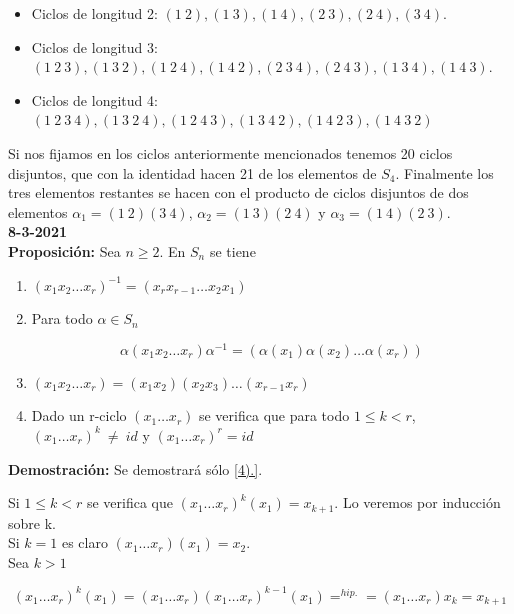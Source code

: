 \documentclass{article}
\begin{document}
\begin{itemize}
\item Ciclos de longitud 2: $(1~2),(1~3),(1~4),(2~3),(2~4),(3~4)$.
\item Ciclos de longitud 3: $(1~2~3),(1~3~2),(1~2~4),(1~4~2),(2~3~4),(2~4~3),(1~3~4),(1~4~3)$.
\item Ciclos de longitud 4: $(1~2~3~4),(1~3~2~4),(1~2~4~3),(1~3~4~2),(1~4~2~3),(1~4~3~2)$
\end{itemize}

Si nos fijamos en los ciclos anteriormente mencionados tenemos 20 ciclos disjuntos, que con la identidad hacen 21 de los elementos de $S_4$. Finalmente los tres elementos restantes se hacen con el producto de ciclos disjuntos de dos elementos $\alpha_1=(1~2)(3~4)$, $\alpha_2=(1~3)(2~4)$ y $\alpha_3=(1~4)(2~3)$. \\

\textbf{8-3-2021} \\

\textbf{Proposición:} Sea $n\geq 2$. En $S_n$ se tiene

\begin{enumerate}
\item $(x_1x_2\ldots x_r)^{-1}=(x_rx_{r-1}\ldots x_2x_1)$
\item Para todo $\alpha \in S_n$

\[
	\alpha(x_1x_2\ldots x_r)\alpha^{-1}=(\alpha(x_1)\alpha(x_2)\ldots\alpha(x_r))
\]

\item \((x_1x_2\ldots x_r)=(x_1x_2)(x_2x_3)\ldots(x_{r-1}x_r)\)
\item \label{4).} Dado un r-ciclo $(x_1\ldots x_r)$ se verifica que para todo $1\leq k < r$, \((x_1\ldots x_r)^k~\neq~id\) y $(x_1\ldots x_r)^r=id$
\end{enumerate}

\textbf{Demostración:} Se demostrará sólo \ref{4).}.

Si $1\leq k < r$ se verifica que $(x_1\ldots x_r)^k(x_1)=x_{k+1}$. Lo veremos por inducción sobre k. \\

Si $k=1$ es claro $(x_1\ldots x_r)(x_1)=x_2$. \\

Sea $k>1$

\begin{equation*}
(x_1\ldots x_r)^k(x_1)=(x_1\ldots x_r)(x_1\ldots x_r)^{k-1}(x_1)=^{hip.}=(x_1\ldots x_r)x_k=x_{k+1}
\end{equation*}
\end{document}
